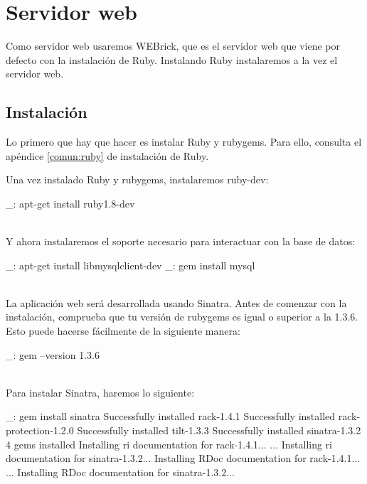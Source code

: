 \chapter{Servidor web}
\label{web:servidor}

Como servidor web usaremos WEBrick, que es el servidor web que viene por defecto con la instalación de Ruby. Instalando Ruby instalaremos a la vez el servidor web.


\section{Instalación}

Lo primero que hay que hacer es instalar Ruby y rubygems. Para ello, consulta el apéndice \ref{comun:ruby} de instalación de Ruby.

Una vez instalado Ruby y rubygems, instalaremos ruby-dev:

\begin{bashcode}
_: apt-get install ruby1.8-dev
\end{bashcode}
\\

Y ahora instalaremos el soporte necesario para interactuar con la base de datos:

\begin{bashcode}
_: apt-get install libmysqlclient-dev
_: gem install mysql
\end{bashcode}
\\

La aplicación web será desarrollada usando Sinatra. Antes de comenzar con la instalación, comprueba que tu versión de rubygems es igual o superior a la 1.3.6. Esto puede hacerse fácilmente de la siguiente manera:

\begin{bashcode}
_: gem --version
1.3.6
\end{bashcode}
\\

Para instalar Sinatra, haremos lo siguiente:

\begin{bashcode}
_: gem install sinatra
Successfully installed rack-1.4.1
Successfully installed rack-protection-1.2.0
Successfully installed tilt-1.3.3
Successfully installed sinatra-1.3.2
4 gems installed
Installing ri documentation for rack-1.4.1...
...
Installing ri documentation for sinatra-1.3.2...
Installing RDoc documentation for rack-1.4.1...
...
Installing RDoc documentation for sinatra-1.3.2...
\end{bashcode}
\\

